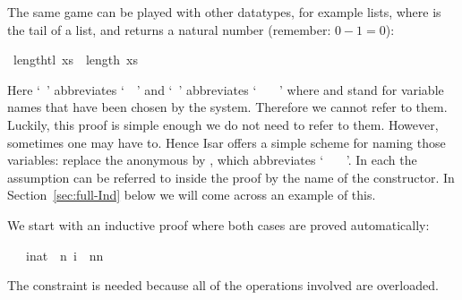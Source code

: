 \begin{isabellebody}
\begin{isamarkuptext}
The same game can be played with other datatypes, for example lists,
where  is the tail of a list, and  returns a
natural number (remember: $0-1=0$):%
\end{isamarkuptext}%
\isamarkuptrue%
\isamarkupfalse%
\ {\isachardoublequote}length{\isacharparenleft}tl\ xs{\isacharparenright}\ {\isacharequal}\ length\ xs\ {\isacharminus}\ {}{\isachardoublequote}\isanewline
\isamarkupfalse%
\isamarkupfalse%
\isamarkupfalse%
\isamarkupfalse%
\isamarkupfalse%
\isamarkupfalse%
\isamarkupfalse%
\isamarkupfalse%
\isamarkupfalse%
\isamarkupfalse%
%
\begin{isamarkuptext}%
\noindent Here `~' abbreviates
`~~' and
`~'
abbreviates `~\isa{{\isacharquery}\ {\isacharquery}{\isacharquery}}
~~'
where \isa{{\isacharquery}} and \isa{{\isacharquery}{\isacharquery}}
stand for variable names that have been chosen by the system.
Therefore we cannot refer to them.
Luckily, this proof is simple enough we do not need to refer to them.
However, sometimes one may have to. Hence Isar offers a simple scheme for
naming those variables: replace the anonymous  by
, which abbreviates `~
~~'.
In each  the assumption can be
referred to inside the proof by the name of the constructor. In
Section~\ref{sec:full-Ind} below we will come across an example
of this.%
\end{isamarkuptext}%
\isamarkuptrue%
%
\isamarkuptrue%
%
\begin{isamarkuptext}%
We start with an inductive proof where both cases are proved automatically:%
\end{isamarkuptext}%
\isamarkuptrue%
\ {\isachardoublequote}{}\ {\isacharasterisk}\ {\isacharparenleft}{\isasymSum}i{\isacharcolon}{\isacharcolon}nat\ {\isacharequal}\ {}{\isachardot}{\isachardot}{\isacharless}n{\isacharplus}{}{\isachardot}\ i{\isacharparenright}\ {\isacharequal}\ n{\isacharasterisk}{\isacharparenleft}n{\isacharplus}{}{\isacharparenright}{\isachardoublequote}\isanewline
\isamarkupfalse%
\isamarkupfalse%
%
\begin{isamarkuptext}%
\noindent The constraint  is needed because all of
the operations involved are overloaded.


\end{isamarkuptext}
\end{isabellebody}
